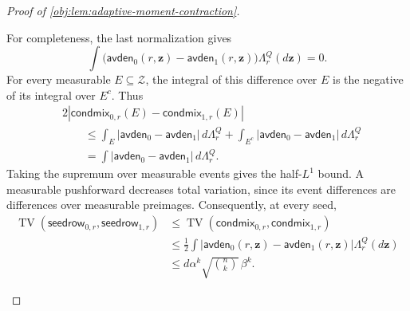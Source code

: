 \begin{proof}[Proof of \cref{obj:lem:adaptive-moment-contraction}]
\begin{enumerate}
For completeness, the last normalization gives
\[
\int\bigl(\mathsf{avden}_0(r,\mathbf z)
          -\mathsf{avden}_1(r,\mathbf z)\bigr)
 \Lambda_r^Q(d\mathbf z)=0.
\]
For every measurable \(E\subseteq\mathcal Z\), the integral of this difference over \(E\) is the negative of its integral over \(E^c\). Thus
\[
\begin{split}
&2\left|
 \mathsf{condmix}_{0,r}(E)-\mathsf{condmix}_{1,r}(E)
 \right|\\
&\qquad\le
 \int_E|\mathsf{avden}_0-\mathsf{avden}_1|\,d\Lambda_r^Q
 +\int_{E^c}|\mathsf{avden}_0-\mathsf{avden}_1|\,d\Lambda_r^Q\\
&\qquad=
 \int|\mathsf{avden}_0-\mathsf{avden}_1|\,d\Lambda_r^Q.
\end{split}
\]
Taking the supremum over measurable events gives the half-\(L^1\) bound. A measurable pushforward decreases total variation, since its event differences are differences over measurable preimages. Consequently, at every seed,
\[
\begin{split}
\operatorname{TV}(\mathsf{seedrow}_{0,r},\mathsf{seedrow}_{1,r})
&\le
\operatorname{TV}(\mathsf{condmix}_{0,r},\mathsf{condmix}_{1,r})\\
&\le
\frac12\int
 |\mathsf{avden}_0(r,\mathbf z)-\mathsf{avden}_1(r,\mathbf z)|
 \Lambda_r^Q(d\mathbf z)\\
&\le d\alpha^k\sqrt{\binom nk}\,\beta^k.
\end{split}
\]


\end{enumerate}
\end{proof}
